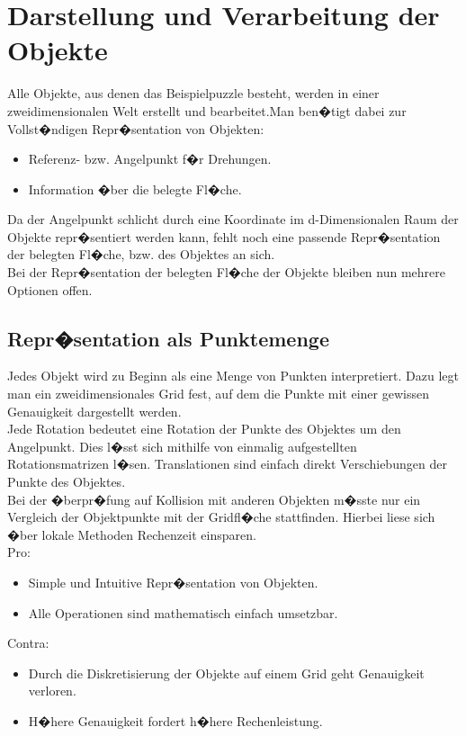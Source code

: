 \section{Darstellung und Verarbeitung der Objekte}
Alle Objekte, aus denen das Beispielpuzzle besteht, werden in einer zweidimensionalen Welt erstellt und bearbeitet.Man ben�tigt dabei zur Vollst�ndigen Repr�sentation von Objekten:
\begin{itemize}
\item Referenz- bzw. Angelpunkt f�r Drehungen.
\item Information �ber die belegte Fl�che. 
\end{itemize} 

Da der Angelpunkt schlicht durch eine Koordinate im d-Dimensionalen Raum der Objekte repr�sentiert werden kann, fehlt noch eine passende Repr�sentation der belegten Fl�che, bzw. des Objektes an sich.\\
Bei der Repr�sentation der belegten Fl�che der Objekte bleiben nun mehrere Optionen offen.
\subsection{Repr�sentation als Punktemenge}
Jedes Objekt wird zu Beginn als eine Menge von Punkten interpretiert. Dazu legt man ein zweidimensionales Grid fest, auf dem die Punkte mit einer gewissen Genauigkeit dargestellt werden.\\
Jede Rotation bedeutet eine Rotation der Punkte des Objektes um den Angelpunkt. Dies l�sst sich mithilfe von einmalig aufgestellten Rotationsmatrizen l�sen. Translationen sind einfach direkt Verschiebungen der Punkte des Objektes.\\
Bei der �berpr�fung auf Kollision mit anderen Objekten m�sste nur ein Vergleich der Objektpunkte mit der Gridfl�che stattfinden. Hierbei liese sich �ber lokale Methoden Rechenzeit einsparen.\\
Pro:
\begin{itemize}
\item Simple und Intuitive Repr�sentation von Objekten.
\item Alle Operationen sind mathematisch einfach umsetzbar.
\end{itemize}
Contra:
\begin{itemize}
\item Durch die Diskretisierung der Objekte auf einem Grid geht Genauigkeit verloren.
\item H�here Genauigkeit fordert h�here Rechenleistung.
\end{itemize}
